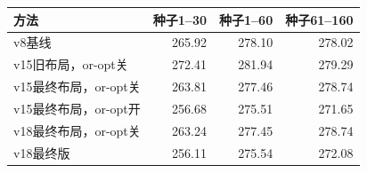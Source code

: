\begin{tabular}{lrrr}\toprule
方法&种子1--30&种子1--60&种子61--160\\\midrule
v8基线&265.92&278.10&278.02\\
v15旧布局，or-opt关&272.41&281.94&279.29\\
v15最终布局，or-opt关&263.81&277.46&278.74\\
v15最终布局，or-opt开&256.68&275.51&271.65\\
v18最终布局，or-opt关&263.24&277.45&278.74\\
v18最终版&256.11&275.54&272.08\\
\bottomrule\end{tabular}
